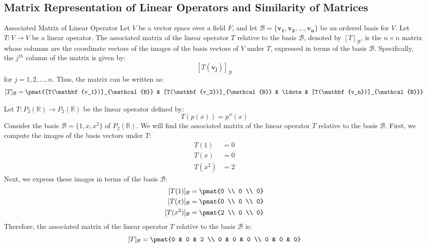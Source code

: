 \documentclass[openany]{book}
\begin{document}
\subsection{Matrix Representation of Linear Operators and Similarity of Matrices}
\begin{mydefinition}{Associated Matrix of Linear Operator}
    Let $V$ be a vector space over a field $F$, and let $\mathcal{B} = \{\mathbf{v_1}, \mathbf{v_2}, \ldots, \mathbf{v_n}\}$ be an ordered basis for $V$. Let $T: V \to V$ be a linear operator. The associated matrix of the linear operator $T$ relative to the basis $\mathcal{B}$, denoted by $[T]_{\mathcal{B}}$, is the $n \times n$ matrix whose columns are the coordinate vectors of the images of the basis vectors of $V$ under $T$, expressed in terms of the basis $\mathcal{B}$. Specifically, the $j^{th}$ column of the matrix is given by:
    $$[T(\mathbf{v_j})]_{\mathcal{B}}$$
    for $j = 1, 2, \ldots, n$. Thus, the matrix can be written as:
    $$[T]_{\mathcal{B}} = \pmat{[T(\mathbf{v_1})]_{\mathcal{B}} & [T(\mathbf{v_2})]_{\mathcal{B}} & \ldots & [T(\mathbf{v_n})]_{\mathcal{B}}}$$
\end{mydefinition}
\begin{example}
    Let $T: P_2(\mathbb{R}) \to P_2(\mathbb{R})$ be the linear operator defined by:
    $$T(p(x)) = p''(x)$$ Consider the basis $\mathcal{B} = \{1, x, x^2\}$ of $P_2(\mathbb{R})$. We will find the associated matrix of the linear operator $T$ relative to the basis $\mathcal{B}$.
    First, we compute the images of the basis vectors under $T$:
    \[\begin{aligned}
    T(1) &= 0 \\
    T(x) &= 0 \\
    T(x^2) &= 2
    \end{aligned}\]
    Next, we express these images in terms of the basis $\mathcal{B}$:
    \[\begin{aligned}
    [T(1)]_{\mathcal{B}} &= \pmat{0 \\ 0 \\ 0} \\
    [T(x)]_{\mathcal{B}} &= \pmat{0 \\ 0 \\ 0} \\
    [T(x^2)]_{\mathcal{B}} &= \pmat{2 \\ 0 \\ 0}
    \end{aligned}\]
    Therefore, the associated matrix of the linear operator $T$ relative to the basis $\mathcal{B}$ is:
    $$[T]_{\mathcal{B}} = \pmat{0 & 0 & 2 \\ 0 & 0 & 0 \\ 0 & 0 & 0}$$
\end{example}
\end{document}

